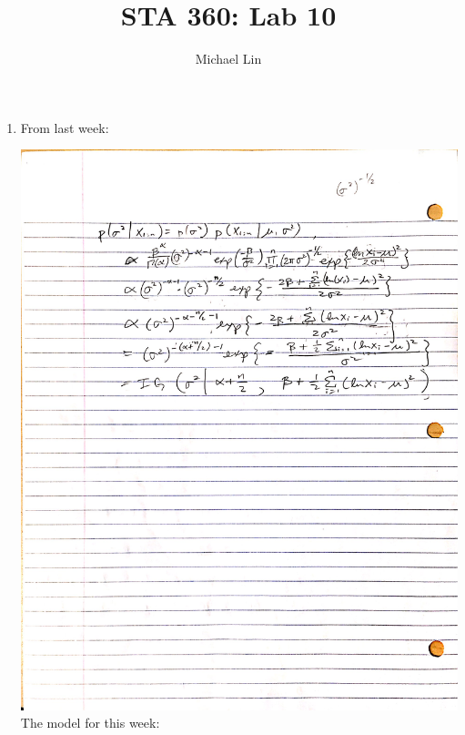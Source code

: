 \documentclass{article}
\title{STA 360: Lab 10}
\author{Michael Lin}
\begin{document}
\maketitle

\begin{enumerate}
\item From last week:

\includegraphics[scale=0.2]{page4.jpg} \\

\pagebreak
The model for this week:


\end{enumerate}
\end{document}
